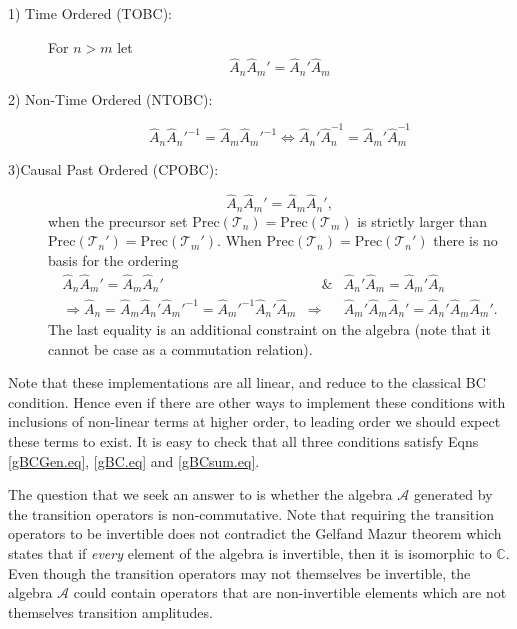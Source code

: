\documentclass[11pt]{article}
\newcommand{\bC}{\mathbb C}
\newcommand{\cT}{\mathcal T}
\newcommand{\cA}{\mathcal A}
\newcommand{\pre}{\mathrm{Prec}}
\newcommand{\hhT}{\hat A}
\begin{document}
\begin{description}
\item[1) Time Ordered (TOBC):] For $n >m$ let 
\begin{equation}
\hhT_n\hhT_m'=\hhT_n'\hhT_m
\end{equation}
\item[2) Non-Time Ordered (NTOBC):] 
\begin{equation}
\hhT_n \hhT_n'^{-1}=\hhT_m\hhT_m'^{-1} \Leftrightarrow \hhT_n' \hhT_n^{-1}=\hhT_m'\hhT_m^{-1} 
\end{equation}
\item[3)Causal Past Ordered (CPOBC):]  
\begin{equation}
\hhT_n\hhT_m'=\hhT_m\hhT_n', 
\end{equation}
when the precursor set $\pre(\cT_n)=\pre(\cT_m)$  is strictly larger than
$\pre(\cT_n')=\pre(\cT_m')$. When $\pre(\cT_n)=\pre(\cT_n')$  there is
no basis for the ordering 
\begin{eqnarray}
  \hhT_n\hhT_m' = \hhT_m\hhT_n' &\quad \& & \hhT_n'\hhT_m= \hhT_m'\hhT_n
                                         \nonumber \\ 
 \Rightarrow     \hhT_n = \hhT_m\hhT_n'  \hhT_m'^{-1}=  \hhT_m'^{-1}
  \hhT_n'\hhT_m                & \Rightarrow &   \hhT_m'\hhT_m \hhT_n'  =  
  \hhT_n'\hhT_m \hhT_m'. 
\end{eqnarray}
The  last equality is an additional constraint on the 
  algebra (note that it cannot be case as a commutation 
  relation).
\end{description}


  

Note that these implementations are all linear, and reduce to the classical BC
condition. Hence even if there are other ways to implement these
conditions with inclusions of non-linear terms at higher order, to
leading order we should expect these terms to exist. It is easy to
check that all three conditions satisfy Eqns \eqref{gBCGen.eq},
\eqref{gBC.eq} and \eqref{gBCsum.eq}.


The question that we seek an answer to is whether the  algebra $\cA$
generated by the transition operators is non-commutative. 
Note that  requiring the transition operators to be invertible  does not contradict the
Gelfand Mazur theorem \cite{rudin}  which states that if
{\it every}  element of the algebra is  invertible,  then it is 
 isomorphic to $\bC$.  Even though the transition operators may not
 themselves be invertible, the algebra $\cA$ could contain operators
 that are non-invertible elements which are not themselves transition amplitudes.  
\end{document}
